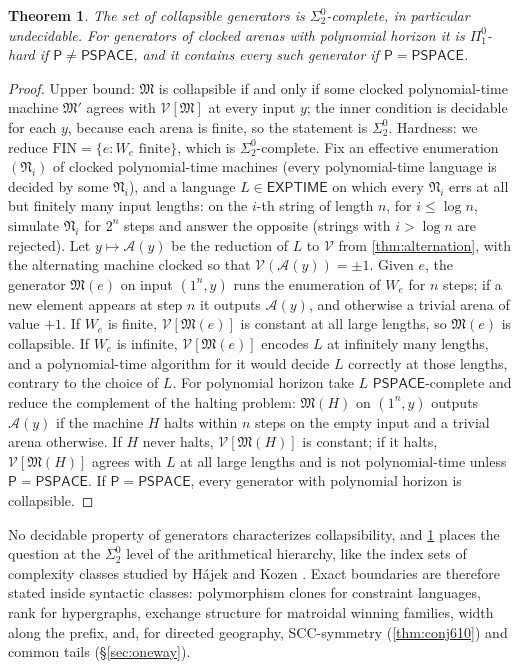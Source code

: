 \documentclass[11pt]{amsart}
\theoremstyle{plain}
\newtheorem{theorem}{Theorem}[section]
\theoremstyle{definition}
\theoremstyle{remark}
\numberwithin{equation}{section}
\newcommand{\val}{\mathcal{V}}            %
\newcommand{\arena}{\mathcal{A}}          %
\newcommand{\cls}[1]{\mathsf{#1}}
\newcommand{\PSPACE}{\cls{PSPACE}}
\newcommand{\EXPTIME}{\cls{EXPTIME}}
\newcommand{\Pclass}{\cls{P}}
\begin{document}
\begin{theorem}\label{thm:sigma2}
The set of collapsible generators is $\Sigma^0_2$-complete, in particular undecidable. For generators of clocked arenas with polynomial horizon it is $\Pi^0_1$-hard if $\Pclass\ne\PSPACE$, and it contains every such generator if $\Pclass=\PSPACE$.
\end{theorem}
\begin{proof}
Upper bound: $\mathfrak M$ is collapsible if and only if some clocked polynomial-time machine $\mathfrak M'$ agrees with $\val[\mathfrak M]$ at every input $y$; the inner condition is decidable for each $y$, because each arena is finite, so the statement is $\Sigma^0_2$.
Hardness: we reduce $\mathrm{FIN}=\{e:W_e\text{ finite}\}$, which is $\Sigma^0_2$-complete. Fix an effective enumeration $(\mathfrak N_i)$ of clocked polynomial-time machines (every polynomial-time language is decided by some $\mathfrak N_i$), and a language $L\in\EXPTIME$ on which every $\mathfrak N_i$ errs at all but finitely many input lengths: on the $i$-th string of length $n$, for $i\le\log n$, simulate $\mathfrak N_i$ for $2^n$ steps and answer the opposite (strings with $i>\log n$ are rejected). Let $y\mapsto\arena(y)$ be the reduction of $L$ to $\val$ from \cref{thm:alternation}, with the alternating machine clocked so that $\val(\arena(y))=\pm1$. Given $e$, the generator $\mathfrak M(e)$ on input $(1^n,y)$ runs the enumeration of $W_e$ for $n$ steps; if a new element appears at step $n$ it outputs $\arena(y)$, and otherwise a trivial arena of value $+1$. If $W_e$ is finite, $\val[\mathfrak M(e)]$ is constant at all large lengths, so $\mathfrak M(e)$ is collapsible. If $W_e$ is infinite, $\val[\mathfrak M(e)]$ encodes $L$ at infinitely many lengths, and a polynomial-time algorithm for it would decide $L$ correctly at those lengths, contrary to the choice of $L$.
For polynomial horizon take $L$ $\PSPACE$-complete and reduce the complement of the halting problem: $\mathfrak M(H)$ on $(1^n,y)$ outputs $\arena(y)$ if the machine $H$ halts within $n$ steps on the empty input and a trivial arena otherwise. If $H$ never halts, $\val[\mathfrak M(H)]$ is constant; if it halts, $\val[\mathfrak M(H)]$ agrees with $L$ at all large lengths and is not polynomial-time unless $\Pclass=\PSPACE$. If $\Pclass=\PSPACE$, every generator with polynomial horizon is collapsible.
\end{proof}

No decidable property of generators characterizes collapsibility, and \cref{thm:sigma2} places the question at the $\Sigma^0_2$ level of the arithmetical hierarchy, like the index sets of complexity classes studied by H\'ajek \cite{Hajek} and Kozen \cite{Kozen}. Exact boundaries are therefore stated inside syntactic classes: polymorphism clones for constraint languages, rank for hypergraphs, exchange structure for matroidal winning families, width along the prefix, and, for directed geography, SCC-symmetry (\cref{thm:conj610}) and common tails (\S\ref{sec:oneway}).
\end{document}
